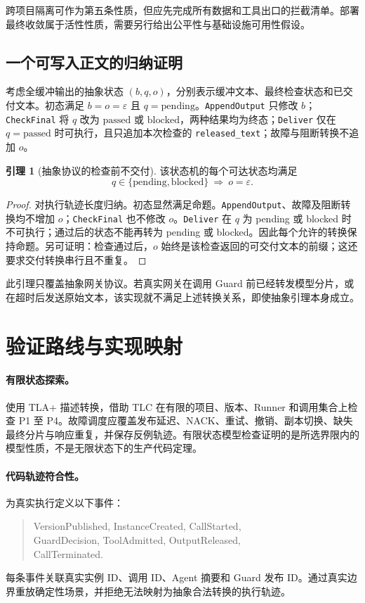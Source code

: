 \documentclass[11pt,a4paper]{article}
\theoremstyle{definition}
\newtheorem{lemma}{引理}
\newcommand{\code}[1]{\texttt{#1}}
\newcommand{\eps}{\varepsilon}
\begin{document}
跨项目隔离可作为第五条性质，但应先完成所有数据和工具出口的拦截清单。部署最终收敛属于活性性质，需要另行给出公平性与基础设施可用性假设。

\subsection{一个可写入正文的归纳证明}

考虑全缓冲输出的抽象状态 $(b,q,o)$，分别表示缓冲文本、最终检查状态和已交付文本。初态满足 $b=o=\eps$ 且 $q=\mathrm{pending}$。\code{AppendOutput} 只修改 $b$；\code{CheckFinal} 将 $q$ 改为 $\mathrm{passed}$ 或 $\mathrm{blocked}$，两种结果均为终态；\code{Deliver} 仅在 $q=\mathrm{passed}$ 时可执行，且只追加本次检查的 \code{released\_text}；故障与阻断转换不追加 $o$。

\begin{lemma}[抽象协议的检查前不交付]
该状态机的每个可达状态均满足
\[
q\in\{\mathrm{pending},\mathrm{blocked}\}\ \Longrightarrow\ o=\eps.
\]
\end{lemma}

\begin{proof}
对执行轨迹长度归纳。初态显然满足命题。\code{AppendOutput}、故障及阻断转换均不增加 $o$；\code{CheckFinal} 也不修改 $o$。\code{Deliver} 在 $q$ 为 pending 或 blocked 时不可执行；通过后的状态不能再转为 pending 或 blocked。因此每个允许的转换保持命题。另可证明：检查通过后，$o$ 始终是该检查返回的可交付文本的前缀；这还要求交付转换串行且不重复。
\end{proof}

此引理只覆盖抽象网关协议。若真实网关在调用 Guard 前已经转发模型分片，或在超时后发送原始文本，该实现就不满足上述转换关系，即使抽象引理本身成立。

\section{验证路线与实现映射}

\paragraph{有限状态探索。} 使用 TLA+ 描述转换，借助 TLC 在有限的项目、版本、Runner 和调用集合上检查 P1 至 P4\cite{tlaplus}。故障调度应覆盖发布延迟、NACK、重试、撤销、副本切换、缺失最终分片与响应重复，并保存反例轨迹。有限状态模型检查证明的是所选界限内的模型性质，不是无限状态下的生产代码定理。

\paragraph{代码轨迹符合性。} 为真实执行定义以下事件：
\begin{quote}\small\ttfamily
VersionPublished, InstanceCreated, CallStarted,\\
GuardDecision, ToolAdmitted, OutputReleased,\\
CallTerminated.
\end{quote}
每条事件关联真实实例 ID、调用 ID、Agent 摘要和 Guard 发布 ID。通过真实边界重放确定性场景，并拒绝无法映射为抽象合法转换的执行轨迹。
\end{document}
